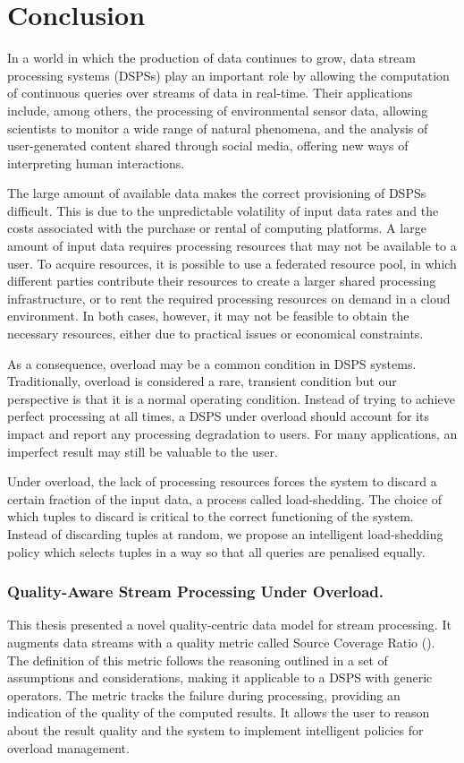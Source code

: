 \chapter{Conclusion} \label{ch:conclusion}
\vspace{-15pt}
In a world in which the production of data continues to grow, data stream processing systems (DSPSs) play
an important role by allowing the computation of continuous queries over streams of data in real-time.
Their applications include, among others, the processing of environmental sensor data, allowing
scientists to monitor a wide range of natural phenomena, and the analysis of user-generated content
shared through social media, offering new ways of interpreting human interactions.

The large amount of available data makes the correct provisioning of DSPSs difficult. This is
due to the unpredictable volatility of input data rates and the costs associated with the purchase or
rental of computing platforms. A large amount of input data requires processing resources that may
not be available to a user. To acquire resources, it is possible
to use a federated resource pool, in which different parties contribute their resources to
create a larger shared processing infrastructure, or to rent the required processing resources on demand
in a cloud environment. In both cases, however, it may not be feasible to obtain the necessary resources,
either due to practical issues or economical constraints.

As a consequence, overload may be a common condition in DSPS systems.
Traditionally, overload is considered a rare, transient condition but our perspective is that it is a
normal operating condition. Instead of trying to achieve perfect processing at all times, a DSPS under
overload should account for its impact and report any processing degradation to users. For many
applications, an imperfect result may still be valuable to the user.

Under overload, the lack of processing resources forces the system to discard a certain fraction of the
input data, a process called load-shedding. The choice of which tuples to discard is critical to the
correct functioning of the system.
Instead of discarding tuples at random, we propose an intelligent load-shedding
policy which selects tuples in a way so that all queries are penalised equally.

\subsection*{Quality-Aware Stream Processing Under Overload.}
This thesis presented a novel quality-centric data model for stream processing. It augments
data streams with a quality metric called Source Coverage Ratio (\sic). 
The definition of this metric follows the reasoning outlined in a set of
assumptions and considerations, making it applicable to a DSPS with
generic operators.
The \sic metric tracks the failure during processing, providing an indication of the
quality of the computed results. 
It allows the user to reason about the result quality and the system to
implement intelligent policies for overload management.

